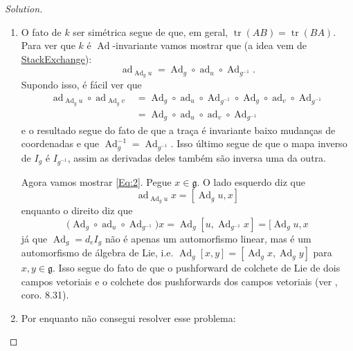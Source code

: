 \begin{proof}[Solution]\leavevmode
	\begin{enumerate}[label=\alph*.]
		\item O fato de $k$ ser simétrica segue de que, em geral, $\operatorname{tr}(AB)=\operatorname{tr}(BA)$. Para ver que $k$ é $\operatorname{Ad}$-invariante vamos mostrar que (a idea vem de \href{https://math.stackexchange.com/questions/2409279/showing-killing-form-is-ad-invariant}{StackExchange}):
	\begin{equation}\label{Eq:2}	\operatorname{ad}_{\operatorname{Ad}_gu}=\operatorname{Ad}_g\circ \operatorname{ad}_u\circ \operatorname{Ad}_{g^{-1}}.
		\end{equation}
			Supondo isso, é fácil ver que
			\begin{align*}
				\operatorname{ad}_{\operatorname{Ad}_gu}\circ \operatorname{ad}_{\operatorname{Ad}_{g}v}&=\operatorname{Ad}_{g}\circ \operatorname{ad}_u\circ \operatorname{Ad}_{g^{-1}}\circ \operatorname{Ad}_g\circ \operatorname{ad}_v\circ \operatorname{Ad}_{g^{-1}}\\
				&=\operatorname{Ad}_g\circ \operatorname{ad}_u\circ \operatorname{ad}_v\circ \operatorname{Ad}_{g^{-1}}
			\end{align*}
			e o resultado segue do fato de que a traça é invariante baixo mudanças de coordenadas e que $\operatorname{Ad}_g^{-1}=\operatorname{Ad}_{g^{-1}}$. Isso último segue de que o mapa inverso de $I_g$  é $I_{g^{-1}}$, assim as derivadas deles também são inversa uma da outra.

			Agora vamos mostrar \cref{Eq:2}. Pegue $x\in\mathfrak{g}$. O lado esquerdo diz que
			\[\operatorname{ad}_{\operatorname{Ad}_gu}x=[\operatorname{Ad}_gu,x]\]
			enquanto o direito diz que
			\[\Big(\operatorname{Ad}_g\circ \operatorname{ad}_u\circ \operatorname{Ad}_{g^{-1}}\Big)x=\operatorname{Ad}_g[u,\operatorname{Ad}_{g^{-1}}x]=[\operatorname{Ad}_gu,x\]
			já que $\operatorname{Ad}_g=d_eI_g$ não é apenas um automorfismo linear, mas é um automorfismo de álgebra de Lie, i.e. $\operatorname{Ad}_g[x,y]=[\operatorname{Ad}_gx,\operatorname{Ad}_gy]$ para $x,y\in\mathfrak{g}$. Isso segue do fato de que o pushforward de colchete de Lie de dois campos vetoriais e o colchete dos pushforwards dos campos vetoriais (ver \cite{lee}, coro. 8.31).
		
\item Por enquanto não consegui resolver esse problema:
	\end{enumerate}
\end{proof}

